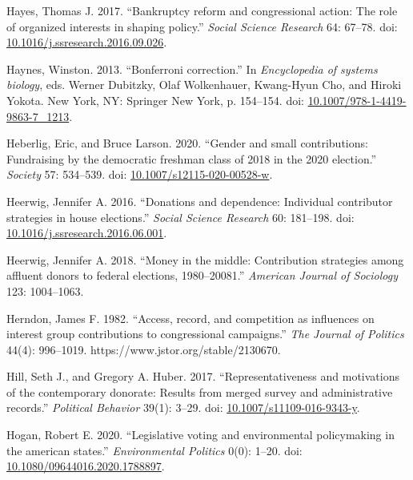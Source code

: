 \documentclass[12pt,]{article}
\newlength{\cslhangindent}
\newenvironment{CSLReferences}%
    {\setlength{\parindent}{0pt}%
    \everypar{\setlength{\hangindent}{\cslhangindent}}\ignorespaces}%
    {\par}
\begin{document}
\begin{CSLReferences}{1}{0}
\leavevmode{}%
Hayes, Thomas J. 2017. {``Bankruptcy reform and congressional action:
The role of organized interests in shaping policy.''} \emph{Social
Science Research} 64: 67--78. doi:
\href{https://doi.org/10.1016/j.ssresearch.2016.09.026}{10.1016/j.ssresearch.2016.09.026}.

\leavevmode{}%
Haynes, Winston. 2013. {``Bonferroni correction.''} In
\emph{Encyclopedia of systems biology}, eds. Werner Dubitzky, Olaf
Wolkenhauer, Kwang-Hyun Cho, and Hiroki Yokota. New York, NY: Springer
New York, p. 154--154. doi:
\href{https://doi.org/10.1007/978-1-4419-9863-7_1213}{10.1007/978-1-4419-9863-7\_1213}.

\leavevmode{}%
Heberlig, Eric, and Bruce Larson. 2020. {``Gender and small
contributions: Fundraising by the democratic freshman class of 2018 in
the 2020 election.''} \emph{Society} 57: 534--539. doi:
\href{https://doi.org/10.1007/s12115-020-00528-w}{10.1007/s12115-020-00528-w}.

\leavevmode{}%
Heerwig, Jennifer A. 2016. {``Donations and dependence: Individual
contributor strategies in house elections.''} \emph{Social Science
Research} 60: 181--198. doi:
\href{https://doi.org/10.1016/j.ssresearch.2016.06.001}{10.1016/j.ssresearch.2016.06.001}.

\leavevmode{}%
Heerwig, Jennifer A. 2018. {``Money in the middle: Contribution
strategies among affluent donors to federal elections, 1980--20081.''}
\emph{American Journal of Sociology} 123: 1004--1063.

\leavevmode{}%
Herndon, James F. 1982. {``Access, record, and competition as influences
on interest group contributions to congressional campaigns.''} \emph{The
Journal of Politics} 44(4): 996--1019.
https://www.jstor.org/stable/2130670.

\leavevmode{}%
Hill, Seth J., and Gregory A. Huber. 2017. {``Representativeness and
motivations of the contemporary donorate: Results from merged survey and
administrative records.''} \emph{Political Behavior} 39(1): 3--29. doi:
\href{https://doi.org/10.1007/s11109-016-9343-y}{10.1007/s11109-016-9343-y}.

\leavevmode{}%
Hogan, Robert E. 2020. {``Legislative voting and environmental
policymaking in the american states.''} \emph{Environmental Politics}
0(0): 1--20. doi:
\href{https://doi.org/10.1080/09644016.2020.1788897}{10.1080/09644016.2020.1788897}.


\end{CSLReferences}
\end{document}
